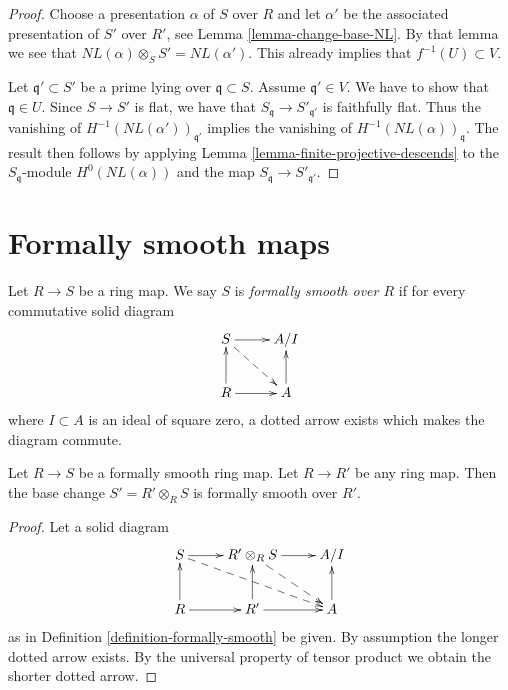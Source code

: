 \begin{proof}
Choose a presentation $\alpha$ of $S$ over $R$ and
let $\alpha'$ be the associated presentation of $S'$
over $R'$, see Lemma \ref{lemma-change-base-NL}.
By that lemma we see that
$NL(\alpha) \otimes_S S' = NL(\alpha')$.
This already implies that $f^{-1}(U) \subset V$.

\medskip\noindent
Let $\mathfrak q' \subset S'$ be a prime lying over
$\mathfrak q \subset S$. Assume $\mathfrak q' \in V$.
We have to show that $\mathfrak q \in U$.
Since $S \to S'$ is flat,
we have that $S_{\mathfrak q} \to S'_{\mathfrak q'}$
is faithfully flat. Thus the vanishing of
$H^{-1}(NL(\alpha'))_{\mathfrak q'}$ implies the
vanishing of $H^{-1}(NL(\alpha))_{\mathfrak q}$.
The result then follows by applying
Lemma \ref{lemma-finite-projective-descends}
to the $S_{\mathfrak q}$-module $H^0(NL(\alpha))$
and the map $S_{\mathfrak q} \to S'_{\mathfrak q'}$.
\end{proof}










\section{Formally smooth maps}
\label{section-formally-smooth}

\begin{definition}
\label{definition-formally-smooth}
Let $R \to S$ be a ring map.
We say $S$ is {\it formally smooth over $R$} if for every
commutative solid diagram
$$
\xymatrix{
S \ar[r] \ar@{-->}[rd] & A/I \\
R \ar[r] \ar[u] & A \ar[u]
}
$$
where $I \subset A$ is an ideal of square zero, a dotted
arrow exists which makes the diagram commute.
\end{definition}

\begin{lemma}
\label{lemma-base-change-fs}
Let $R \to S$ be a formally smooth ring map.
Let $R \to R'$ be any ring map.
Then the base change $S' = R' \otimes_R S$ is formally smooth over $R'$.
\end{lemma}

\begin{proof}
Let a solid diagram
$$
\xymatrix{
S \ar[r] \ar@{-->}[rrd] & R' \otimes_R S \ar[r] \ar@{-->}[rd] & A/I \\
R  \ar[u] \ar[r] & R' \ar[r] \ar[u] & A \ar[u]
}
$$
as in Definition \ref{definition-formally-smooth} be given.
By assumption the longer dotted arrow exists. By the universal
property of tensor product we obtain the shorter dotted arrow.
\end{proof}

